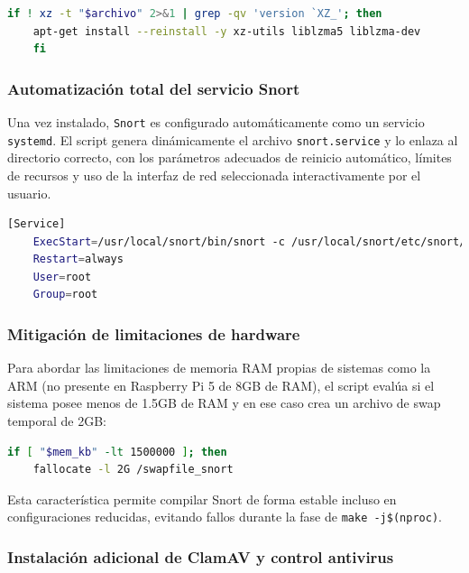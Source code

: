 \documentclass[11pt,a4paper,twoside]{report}
\begin{document}
\begin{lstlisting}[language=bash, caption={Validación e instalación segura de paquetes .xz}, label=lst:xz]
	if ! xz -t "$archivo" 2>&1 | grep -qv 'version `XZ_'; then
	apt-get install --reinstall -y xz-utils liblzma5 liblzma-dev
	fi
\end{lstlisting}

\subsubsection{Automatización total del servicio Snort}

Una vez instalado, \texttt{Snort} es configurado automáticamente como un servicio \texttt{systemd}. El script genera dinámicamente el archivo \texttt{snort.service} y lo enlaza al directorio correcto, con los parámetros adecuados de reinicio automático, límites de recursos y uso de la interfaz de red seleccionada interactivamente por el usuario.

\begin{lstlisting}[language=bash, caption={Sección relevante del systemd generado}, label=lst:systemd]
	[Service]
	ExecStart=/usr/local/snort/bin/snort -c /usr/local/snort/etc/snort/snort.lua -i eth0 -A alert_fast
	Restart=always
	User=root
	Group=root
\end{lstlisting}

\subsubsection{Mitigación de limitaciones de hardware}

Para abordar las limitaciones de memoria RAM propias de sistemas como la ARM (no presente en Raspberry Pi 5 de 8GB de RAM), el script evalúa si el sistema posee menos de 1.5GB de RAM y en ese caso crea un archivo de swap temporal de 2GB:

\begin{lstlisting}[language=bash]
	if [ "$mem_kb" -lt 1500000 ]; then
	fallocate -l 2G /swapfile_snort
\end{lstlisting}

Esta característica permite compilar Snort de forma estable incluso en configuraciones reducidas, evitando fallos durante la fase de \texttt{make -j\$(nproc)}.

\subsubsection{Instalación adicional de ClamAV y control antivirus}
\end{document}
